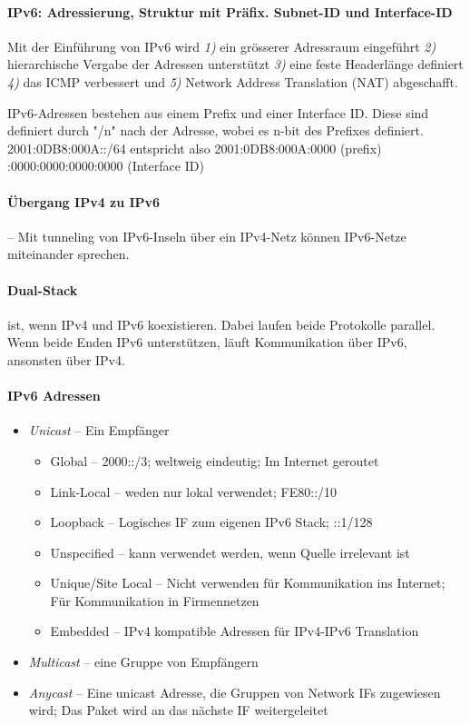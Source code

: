 \documentclass[a4paper,12pt]{article}
\begin{document}
\paragraph{IPv6: Adressierung, Struktur mit Präfix. Subnet-ID und Interface-ID}
Mit der Einführung von IPv6 wird \emph{1)} ein grösserer Adressraum eingeführt  \emph{2)} hierarchische Vergabe der Adressen unterstützt \emph{3)} eine feste Headerlänge definiert  \emph{4)} das ICMP verbessert und  \emph{5)} Network Address Translation (NAT) abgeschafft.

IPv6-Adressen bestehen aus einem Prefix und einer Interface ID. Diese sind definiert durch "/n" nach der Adresse, wobei es n-bit des Prefixes definiert. 2001:0DB8:000A::/64 entspricht also 2001:0DB8:000A:0000 (prefix) :0000:0000:0000:0000 (Interface ID)

\paragraph{Übergang IPv4 zu IPv6} -- Mit tunneling von IPv6-Inseln über ein IPv4-Netz können IPv6-Netze miteinander sprechen.

\paragraph{Dual-Stack} ist, wenn IPv4 und IPv6 koexistieren. Dabei laufen beide Protokolle parallel. Wenn beide Enden IPv6 unterstützen, läuft Kommunikation über IPv6, ansonsten über IPv4.

\paragraph{IPv6 Adressen}
\begin{itemize}
\item \emph{Unicast} -- Ein Empfänger
	\begin{itemize}
	\item Global -- 2000::/3; weltweig eindeutig; Im Internet geroutet
	\item Link-Local -- weden nur lokal verwendet; FE80::/10
	\item Loopback -- Logisches IF zum eigenen IPv6 Stack; ::1/128
	\item Unspecified -- kann verwendet werden, wenn Quelle irrelevant ist
	\item Unique/Site Local -- Nicht verwenden für Kommunikation ins Internet; Für Kommunikation in Firmennetzen
	\item Embedded -- IPv4 kompatible Adressen für IPv4-IPv6 Translation
	\end{itemize}
\item \emph{Multicast} -- eine Gruppe von Empfängern
\item \emph{Anycast} -- Eine unicast Adresse, die Gruppen von Network IFs zugewiesen wird; Das Paket wird an das nächste IF weitergeleitet
\end{itemize}
\end{document}
